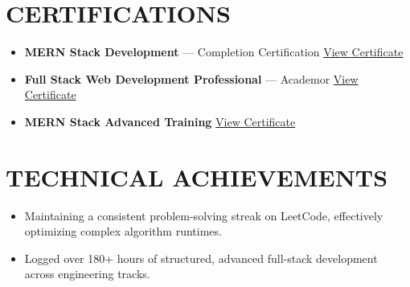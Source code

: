 \documentclass[10.5pt,a4paper]{article}
\begin{document}
\section{CERTIFICATIONS}
\begin{itemize}
  \item \textbf{MERN Stack Development} --- Completion Certification \hfill \href{https://github.com/Amjadkhan9756/certification/blob/main/MERN.png}{\small View Certificate}
  \item \textbf{Full Stack Web Development Professional} --- Academor \hfill \href{https://github.com/Amjadkhan9756/certification/blob/main/Internshif.png}{\small View Certificate}
  \item \textbf{MERN Stack Advanced Training} \hfill \href{https://github.com/Amjadkhan9756/certification/blob/main/Internshif.png}{\small View Certificate}
\end{itemize}

\section{TECHNICAL ACHIEVEMENTS}
\begin{itemize}
  \item Maintaining a consistent problem-solving streak on LeetCode, effectively optimizing complex algorithm runtimes.
  \item Logged over 180+ hours of structured, advanced full-stack development across engineering tracks.
\end{itemize}
\end{document}
